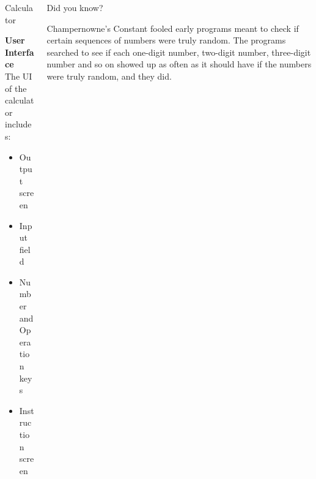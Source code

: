 \documentclass[final]{beamer}
\newlength{\onecolwid}
\newlength{\twocolwid}
\begin{document}
\begin{frame}[t]
\begin{columns}[t]
\begin{column}{\twocolwid}
\begin{columns}[t,totalwidth=\twocolwid]
\begin{column}{\onecolwid}
\begin{block}{Calculator}
\vskip3cm

\textbf{User Interface} \\
\vspace{0.7cm}
 The UI of the calculator includes:

\begin{itemize}
\item Output screen
\item Input field
\item Number and Operation keys
\item Instruction screen
\end{itemize}

\end{block}


\end{column} %

\begin{column}{\onecolwid}\vspace{-.6in} %



\begin{alertblock}{Did you know?}

Champernowne's Constant fooled early programs meant to check if certain sequences of numbers were truly random. \newline
The programs searched to see if each one-digit number, two-digit number, three-digit number and so on showed up as often as it should have if the numbers were truly random, and they did.

\end{alertblock}

\vspace{2cm}


\end{column}
\end{columns}
\end{column}
\end{columns}
\end{frame}
\end{document}
